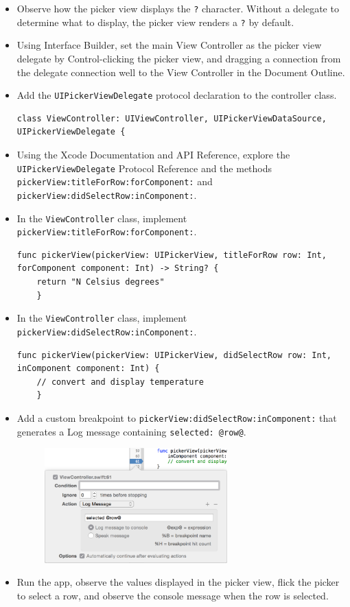 \documentclass[a4paper,11pt]{scrartcl}
\begin{document}
\begin{itemize}
\item Observe how the picker view displays the \texttt{?} character. Without a delegate to determine what to display, the picker view renders a \texttt{?} by default.
\item Using Interface Builder, set the main View Controller as the picker view delegate by Control-clicking the picker view, and dragging a connection from the delegate connection well to the View Controller in the Document Outline.
\item Add the \texttt{UIPickerViewDelegate} protocol declaration to the controller class.
\begin{lstlisting}
class ViewController: UIViewController, UIPickerViewDataSource, UIPickerViewDelegate {
\end{lstlisting}
\item Using the Xcode Documentation and API Reference, explore the \texttt{UIPickerViewDelegate} Protocol Reference and the methods \texttt{pickerView:titleForRow:forComponent:} and \\\texttt{pickerView:didSelectRow:inComponent:}.
\item In the \texttt{ViewController} class, implement \texttt{pickerView:titleForRow:forComponent:}.
\begin{lstlisting}
func pickerView(pickerView: UIPickerView, titleForRow row: Int, forComponent component: Int) -> String? {
	return "N Celsius degrees"
	}
\end{lstlisting}
\item In the \texttt{ViewController} class, implement \texttt{pickerView:didSelectRow:inComponent:}.
\begin{lstlisting}
func pickerView(pickerView: UIPickerView, didSelectRow row: Int, inComponent component: Int) {
	// convert and display temperature
	}
\end{lstlisting}
\item Add a custom breakpoint to \texttt{pickerView:didSelectRow:inComponent:} that generates a Log message containing \texttt{selected: @row@}.
\begin{figure}[h]
	\begin{center}
   \includegraphics[width=200pt]{breakpoint.png}
	\end{center}
\end{figure}
\item Run the app, observe the values displayed in the picker view, flick the picker to select a row, and observe the console message when the row is selected.
\end{itemize}
\end{document}

